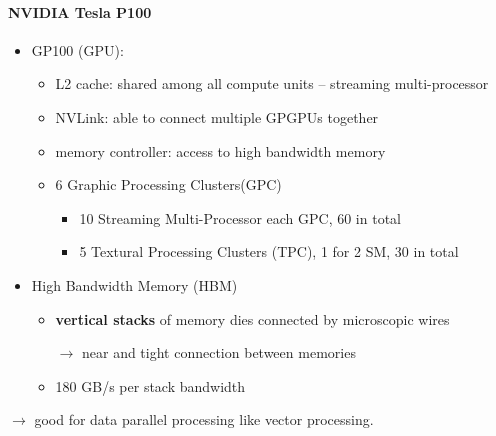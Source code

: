 \paragraph{NVIDIA Tesla P100}
\begin{itemize}
	\item GP100 (GPU):
	\begin{itemize}
		\item L2 cache: shared among all compute units --  streaming multi-processor
		\item NVLink: able to connect multiple GPGPUs together
		\item memory controller: access to high bandwidth memory
		\item 6 Graphic Processing Clusters(GPC)
			\begin{itemize}
				\item 10 Streaming Multi-Processor each GPC, 60 in total
				\item 5 Textural Processing Clusters (TPC), 1 for 2 SM, 30 in total
			\end{itemize}
		\end{itemize}

		\item High Bandwidth Memory (HBM)
		\begin{itemize}
			\item \textbf{vertical stacks} of memory dies connected by microscopic wires
		
			$\rightarrow$ near and tight connection between memories
			\item 180 GB/s per stack bandwidth
		\end{itemize}
\end{itemize}

$\rightarrow$ good for data parallel processing like vector processing.

